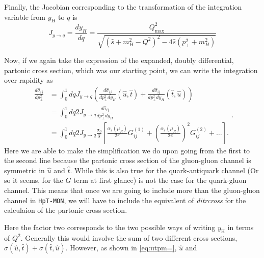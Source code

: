\documentclass[10pt]{report}
\begin{document}
Finally, the Jacobian corresponding to the transformation of the integration variable from $y_H$ to $q$ is 
\begin{equation}
J_{y \rightarrow q} =\frac{d y_H}{d q}=\frac{Q^2 _\mathrm{max}}{\sqrt{\left(\hat{s}+m_H^{2}-Q^{2}\right)^{2}-4 \hat{s}\left(p_{\perp}^{2}+m_H^{2}\right)}}
\label{eq:jacytoq}
\end{equation}

Now, if we again take the expression of the expanded, doubly differential, partonic cross section, which was our starting point, we can write the integration over rapidity as 
\begin{equation}
\begin{aligned}
\frac{d \hat{\sigma}_{i j}}{d p_{\perp}^{2} } &= \int_0^1 dq   J_{y \rightarrow q} \left( \frac{d \hat{\sigma}_{i j}}{d p_{\perp}^{2} d y_{H}}\left(\hat{u},\hat{t}\right) + \frac{d \hat{\sigma}_{i j}}{d p_{\perp}^{2} d y_{H}}\left(\hat{t},\hat{u}\right) \right) \\
&= \int_0^1 dq 2 J_{y \rightarrow q} \frac{d \hat{\sigma}_{i j}}{d p_{\perp}^{2} d y_{H}} \\
&= \int_0^1 dq 2 J_{y \rightarrow q}\frac{\sigma_{0}}{\hat{s}}\left[\frac{\alpha_{s}\left(\mu_{R}\right)}{2 \pi} G_{i j}^{(1)}+\left(\frac{\alpha_{s}\left(\mu_{R}\right)}{2 \pi}\right)^{2} G_{i j}^{(2)}+\ldots\right].
\end{aligned}.
\end{equation}
Here we are able to make the simplification we do upon going from the first to the second line because the partonic cross section of the gluon-gluon channel is symmetric in $\hat{u}$ and $\hat{t}$. While this is also true for the quark-antiquark channel (Or so it seems, for the $G$ term at first glance) is not the case for the quark-gluon channel. This means that once we are going to include more than the gluon-gluon channel in \texttt{HpT-MON}, we will have to include the equivalent of \textit{ditrcross} for the calculaion of the partonic cross section.


Here the factor two corresponds to the two possible ways of writing $y_\mathrm{H}$ in terms of $Q^2$. Generally this would involve the sum of two different cross sections, $\sigma(\hat{u},\hat{t})+\sigma(\hat{t},\hat{u})$. However, as shown in \eqref{eq:utpm=}, $\hat{u}$ and 
\end{document}
